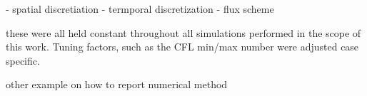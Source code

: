 - spatial discretiation
- termporal discretization
- flux scheme

these were all held constant throughout all simulations performed in the scope of this work. Tuning factors, such as the CFL min/max number were adjusted case specific.

other example on how to report numerical method